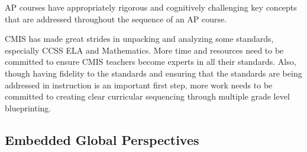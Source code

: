 \begin{findings}
AP courses have appropriately rigorous and cognitively challenging key concepts that are addressed throughout the sequence of an AP course.  


CMIS has made great strides in unpacking and analyzing some standards, especially CCSS ELA  and Mathematics. More time and resources need to be committed to ensure CMIS teachers become experts in all their standards. Also, though having fidelity to the standards and ensuring that the standards are being addressed in instruction is an important first step, more work needs to be committed to creating clear curricular sequencing through multiple grade level blueprinting. 
\end{findings}

\subsection{Embedded Global Perspectives}



